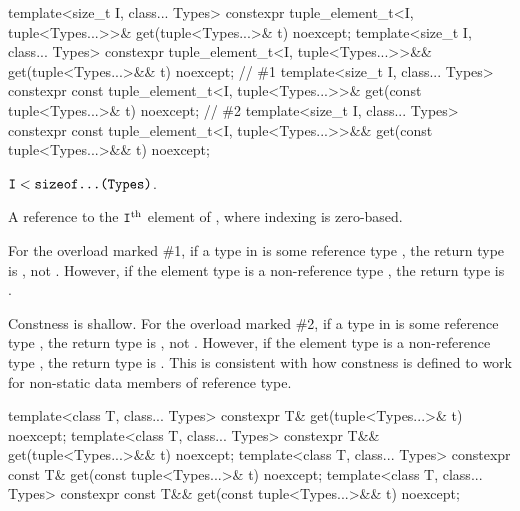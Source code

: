 %
\begin{itemdecl}
template<size_t I, class... Types>
  constexpr tuple_element_t<I, tuple<Types...>>&
    get(tuple<Types...>& t) noexcept;
template<size_t I, class... Types>
  constexpr tuple_element_t<I, tuple<Types...>>&&
    get(tuple<Types...>&& t) noexcept;        // \#1
template<size_t I, class... Types>
  constexpr const tuple_element_t<I, tuple<Types...>>&
    get(const tuple<Types...>& t) noexcept;   // \#2
template<size_t I, class... Types>
  constexpr const tuple_element_t<I, tuple<Types...>>&& get(const tuple<Types...>&& t) noexcept;
\end{itemdecl}

\begin{itemdescr}
\pnum
\mandates
$\texttt{\protect I} < \texttt{\protect sizeof...(Types)}$.

\pnum
\returns
A reference to the $\texttt{\protect I}^\text{th}$ element of , where
indexing is zero-based.

\pnum
\begin{note}
For the overload marked \#1,
if a type  in  is some reference type ,
the return type is , not .
However, if the element type is a non-reference type ,
the return type is .
\end{note}

\pnum
\begin{note}
Constness is shallow.
For the overload marked \#2,
if a type  in  is some reference type ,
the return type is , not .
However, if the element type is a non-reference type ,
the return type is .
This is consistent with how constness is defined to work
for non-static data members of reference type.
\end{note}
\end{itemdescr}

%
\begin{itemdecl}
template<class T, class... Types>
  constexpr T& get(tuple<Types...>& t) noexcept;
template<class T, class... Types>
  constexpr T&& get(tuple<Types...>&& t) noexcept;
template<class T, class... Types>
  constexpr const T& get(const tuple<Types...>& t) noexcept;
template<class T, class... Types>
  constexpr const T&& get(const tuple<Types...>&& t) noexcept;
\end{itemdecl}

